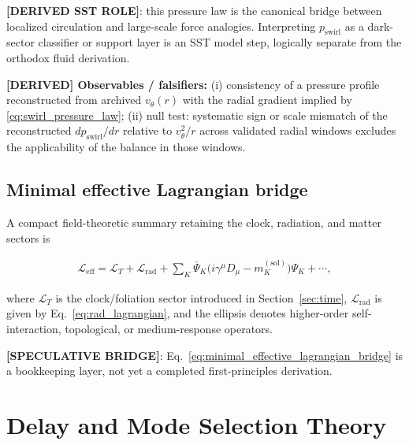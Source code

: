 \documentclass[11pt]{article}
\theoremstyle{definition}
\theoremstyle{plain}
\theoremstyle{remark}
\begin{document}
        \textbf{[DERIVED SST ROLE]}: this pressure law is the canonical bridge between localized circulation and large-scale force analogies. Interpreting $p_{\mathrm{swirl}}$ as a dark-sector classifier or support layer is an SST model step, logically separate from the orthodox fluid derivation.

        \textbf{[DERIVED] Observables / falsifiers:} (i) consistency of a pressure profile reconstructed from archived $v_\theta(r)$ with the radial gradient implied by \eqref{eq:swirl_pressure_law}; (ii) null test: systematic sign or scale mismatch of the reconstructed $dp_{\mathrm{swirl}}/dr$ relative to $v_\theta^2/r$ across validated radial windows excludes the applicability of the balance in those windows.

    \subsection{Minimal effective Lagrangian bridge}

        A compact field-theoretic summary retaining the clock, radiation, and matter sectors is

        \begin{align}
            \mathcal{L}_{\mathrm{eff}}
            =
            \mathcal{L}_{T}
            +
            \mathcal{L}_{\mathrm{rad}}
            +
            \sum_K \bar\Psi_K\bigl(i\gamma^\mu D_\mu - m_K^{(\mathrm{sol})}\bigr)\Psi_K
            + \cdots,
            \label{eq:minimal_effective_lagrangian_bridge}
        \end{align}

        where $\mathcal{L}_{T}$ is the clock/foliation sector introduced in Section~\ref{sec:time}, $\mathcal{L}_{\mathrm{rad}}$ is given by Eq.~\eqref{eq:rad_lagrangian}, and the ellipsis denotes higher-order self-interaction, topological, or medium-response operators.

        \textbf{[SPECULATIVE BRIDGE]}: Eq.~\eqref{eq:minimal_effective_lagrangian_bridge} is a bookkeeping layer, not yet a completed first-principles derivation.

        
\section{Delay and Mode Selection Theory}
    \label{sec:delay}
    
\end{document}
